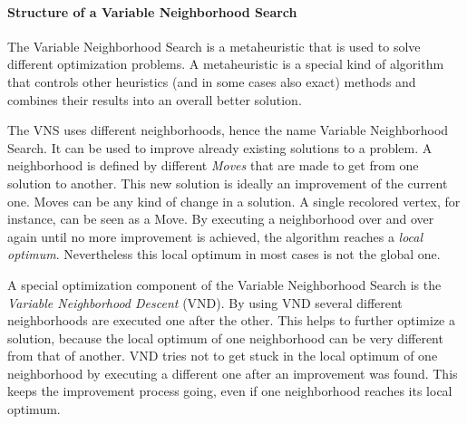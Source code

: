 \documentclass[paper = a4, fontsize = 10pt]{scrartcl}
\begin{document}
\paragraph{Structure of a Variable Neighborhood Search}{
The Variable Neighborhood Search is a metaheuristic that is used to solve different optimization problems. A metaheuristic is a special kind of algorithm that controls other heuristics (and in some cases also exact) methods and combines their results into an overall better solution.


The VNS uses different neighborhoods, hence the name Variable Neighborhood Search. It can be used to improve already existing solutions to a problem. A neighborhood is defined by different \emph{Moves} that are made to get from one solution to another. This new solution is ideally an improvement of the current one. Moves can be any kind of change in a solution. A single recolored vertex, for instance, can be seen as a Move. By executing a neighborhood over and over again until no more improvement is achieved, the algorithm reaches a \emph{local optimum}. Nevertheless this local optimum in most cases is not the global one.


A special optimization component of the Variable Neighborhood Search is the \emph{Variable Neighborhood Descent} (VND). By using VND several different neighborhoods are executed one after the other. This helps to further optimize a solution, because the local optimum of one neighborhood can be very different from that of another. VND tries not to get stuck in the local optimum of one neighborhood by executing a different one after an improvement was found. This keeps the improvement process going, even if one neighborhood reaches its local optimum.

}
\end{document}
